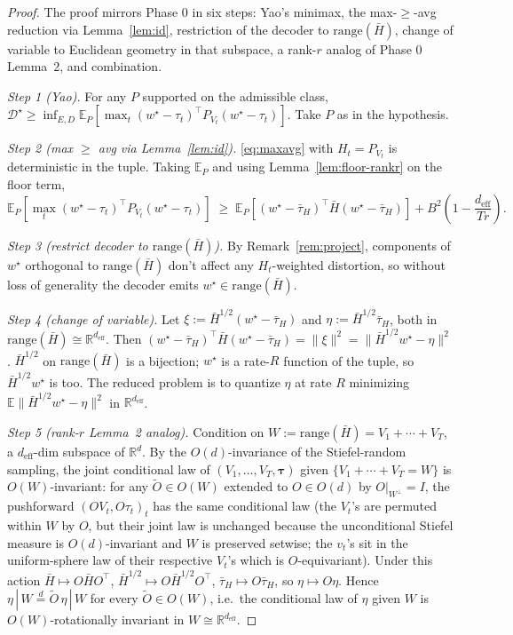 \documentclass{article}
\theoremstyle{remark}
\newcommand{\R}{\mathbb{R}}
\newcommand{\E}{\mathbb{E}}
\newcommand{\range}{\mathrm{range}}
\newcommand{\deff}{d_{\mathrm{eff}}}
\newcommand{\tauH}{\bar\tau_{H}}
\begin{document}
\begin{proof}
The proof mirrors Phase 0 in six steps: Yao's minimax, the max-$\geq$-avg
reduction via Lemma~\ref{lem:id}, restriction of the decoder to
$\range(\bar H)$, change of variable to Euclidean geometry in that
subspace, a rank-$r$ analog of Phase 0 Lemma~2, and combination.

\emph{Step 1 (Yao).} For any $P$ supported on the admissible class,
$\mathcal{D}^\star \geq \inf_{E,D}\E_P[\max_t(w^\star - \tau_t)^\top
P_{V_t}(w^\star - \tau_t)]$. Take $P$ as in the hypothesis.

\emph{Step 2 (max $\geq$ avg via Lemma~\ref{lem:id}).}
\eqref{eq:maxavg} with $H_t = P_{V_t}$ is deterministic in the tuple.
Taking $\E_P$ and using Lemma~\ref{lem:floor-rankr} on the floor term,
\begin{equation}\label{eq:reduce-rankr}
  \E_P\!\left[\max_t(w^\star-\tau_t)^\top P_{V_t}(w^\star-\tau_t)\right]
  \;\geq\;
  \E_P\!\left[(w^\star-\tauH)^\top\bar H(w^\star-\tauH)\right]
  + B^2\!\left(1 - \frac{\deff}{Tr}\right).
\end{equation}

\emph{Step 3 (restrict decoder to $\range(\bar H)$).} By
Remark~\ref{rem:project}, components of $w^\star$ orthogonal to
$\range(\bar H)$ don't affect any $H_t$-weighted distortion, so
without loss of generality the decoder emits
$w^\star \in \range(\bar H)$.

\emph{Step 4 (change of variable).} Let $\xi := \bar H^{1/2}(w^\star
- \tauH)$ and $\eta := \bar H^{1/2}\tauH$, both in
$\range(\bar H)\cong\R^{\deff}$. Then $(w^\star-\tauH)^\top
\bar H(w^\star-\tauH) = \|\xi\|^2 = \|\bar H^{1/2}w^\star - \eta\|^2$.
$\bar H^{1/2}$ on $\range(\bar H)$ is a bijection; $w^\star$ is a
rate-$R$ function of the tuple, so $\bar H^{1/2}w^\star$ is too. The
reduced problem is to quantize $\eta$ at rate $R$ minimizing
$\E\|\bar H^{1/2}w^\star-\eta\|^2$ in $\R^{\deff}$.

\emph{Step 5 (rank-$r$ Lemma~2 analog).} Condition on
$W := \range(\bar H) = V_1 + \cdots + V_T$, a $\deff$-dim subspace of
$\R^d$. By the $O(d)$-invariance of the Stiefel-random sampling, the
joint conditional law of $(V_1,\dots,V_T,\boldsymbol\tau)$ given
$\{V_1+\cdots+V_T = W\}$ is $O(W)$-invariant: for any $\tilde O\in O(W)$
extended to $O\in O(d)$ by $O|_{W^\perp} = I$, the pushforward
$(OV_t, O\tau_t)_t$ has the same conditional law (the $V_t$'s are
permuted within $W$ by $O$, but their joint law is unchanged because
the unconditional Stiefel measure is $O(d)$-invariant and $W$ is
preserved setwise; the $v_t$'s sit in the uniform-sphere law of their
respective $V_t$'s which is $O$-equivariant). Under this action
$\bar H \mapsto O\bar H O^\top$, $\bar H^{1/2}\mapsto O\bar H^{1/2} O^\top$,
$\tauH\mapsto O\tauH$, so $\eta \mapsto O\eta$. Hence
$\eta\,|\,W \stackrel{d}{=} \tilde O\,\eta\,|\,W$ for every
$\tilde O\in O(W)$, i.e.\ the conditional law of $\eta$ given $W$ is
$O(W)$-rotationally invariant in $W \cong \R^{\deff}$.


\end{proof}
\end{document}
